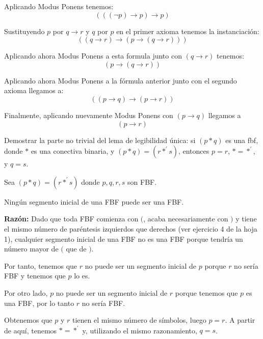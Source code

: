\begin{problem}[1]
Aplicando Modus Ponens tenemos:
\[ ( ((\neg p) \to p) \to p)\]

\spart
Sustituyendo $p$ por $q \to r$ y $q$ por $p$ en el primer axioma tenemos la instanciación:
\[((q \to r) \to (p \to (q \to r)))\]

Aplicando ahora Modus Ponens a esta formula junto con $(q \to r)$ tenemos:
\[(p \to (q \to r))\]

Aplicando ahora Modus Ponens a la fórmula anterior junto con el segundo axioma llegamos a:
\[ ( (p\to q) \to (p\to r))\]

Finalmente, aplicando nuevamente Modus Ponens con $(p \to q)$ llegamos a
\[(p \to r )\]
\end{problem}

\begin{problem}[2]
Demostrar la parte no trivial del lema de legibilidad \'unica: si $(p * q)$ es una fbf, donde $*$ es una conectiva
binaria, y $(p * q) = (r *^\prime s)$, entonces $p = r$,  $*  = *^\prime$, y $q = s$.
\solution

Sea $(p \ast q) = (r\ast^\prime s)$ donde $p,q,r,s$ son FBF.

Ningún segmento inicial de una FBF puede ser una FBF.

\textbf{Razón: } Dado que toda FBF comienza con $($, acaba necesariamente con $)$ y tiene el mismo número de paréntesis izquierdos que derechos (ver ejercicio 4 de la hoja 1), cualquier segmento inicial de una FBF no es una FBF porque tendría un número mayor de $($ que de $)$.

Por tanto, tenemos que $r$ no puede ser un segmento inicial de $p$ porque $r$ no sería FBF y tenemos que $p$ lo es.

Por otro lado, $p$ no puede ser un segmento inicial de $r$ porque tenemos que $p$ es una FBF, por lo tanto $r$ no sería FBF.

Obtenemos que $p$ y $r$ tienen el mismo número de símbolos, luego $p=r$. A partir de aquí, tenemos $\ast = \ast^\prime$ y, utilizando el mismo razonamiento, $q=s$.

\end{problem}


